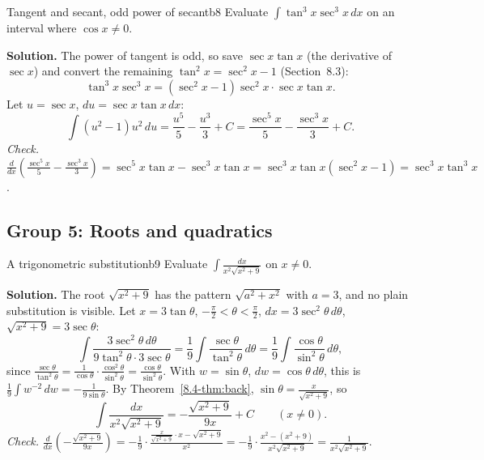 \documentclass[11pt]{article}
\begin{document}
\begin{exmp}{Tangent and secant, odd power of secant}{b8}
Evaluate $\displaystyle\int\tan^3x\sec^3x\,dx$ on an interval where $\cos x\ne0$.

\textbf{Solution.} The power of tangent is odd, so save $\sec x\tan x$ (the derivative of $\sec x$) and convert the remaining $\tan^2x=\sec^2x-1$ (Section~8.3):
\[\tan^3x\sec^3x=\left(\sec^2x-1\right)\sec^2x\cdot\sec x\tan x .\]
Let $u=\sec x$, $du=\sec x\tan x\,dx$:
\[\int\left(u^2-1\right)u^2\,du=\frac{u^5}5-\frac{u^3}3+C=\frac{\sec^5x}5-\frac{\sec^3x}3+C .\]
\emph{Check.} $\frac d{dx}\left(\frac{\sec^5x}5-\frac{\sec^3x}3\right)=\sec^5x\tan x-\sec^3x\tan x=\sec^3x\tan x\left(\sec^2x-1\right)=\sec^3x\tan^3x$.
\end{exmp}

\subsection*{Group 5: Roots and quadratics}

\begin{exmp}{A trigonometric substitution}{b9}
Evaluate $\displaystyle\int\frac{dx}{x^2\sqrt{x^2+9}}$ on $x\ne0$.

\textbf{Solution.} The root $\sqrt{x^2+9}$ has the pattern $\sqrt{a^2+x^2}$ with $a=3$, and no plain substitution is visible. Let $x=3\tan\theta$, $-\frac\pi2<\theta<\frac\pi2$, $dx=3\sec^2\theta\,d\theta$, $\sqrt{x^2+9}=3\sec\theta$:
\[\int\frac{3\sec^2\theta\,d\theta}{9\tan^2\theta\cdot3\sec\theta}=\frac19\int\frac{\sec\theta}{\tan^2\theta}\,d\theta=\frac19\int\frac{\cos\theta}{\sin^2\theta}\,d\theta,\]
since $\frac{\sec\theta}{\tan^2\theta}=\frac1{\cos\theta}\cdot\frac{\cos^2\theta}{\sin^2\theta}=\frac{\cos\theta}{\sin^2\theta}$. With $w=\sin\theta$, $dw=\cos\theta\,d\theta$, this is $\frac19\int w^{-2}\,dw=-\frac1{9\sin\theta}$. By Theorem~\ref{8.4-thm:back}, $\sin\theta=\frac x{\sqrt{x^2+9}}$, so
\[\int\frac{dx}{x^2\sqrt{x^2+9}}=-\frac{\sqrt{x^2+9}}{9x}+C\qquad(x\ne0).\]
\emph{Check.} $\frac d{dx}\left(-\frac{\sqrt{x^2+9}}{9x}\right)=-\frac19\cdot\frac{\frac{x}{\sqrt{x^2+9}}\cdot x-\sqrt{x^2+9}}{x^2}=-\frac19\cdot\frac{x^2-(x^2+9)}{x^2\sqrt{x^2+9}}=\frac{1}{x^2\sqrt{x^2+9}}$.
\end{exmp}
\end{document}
